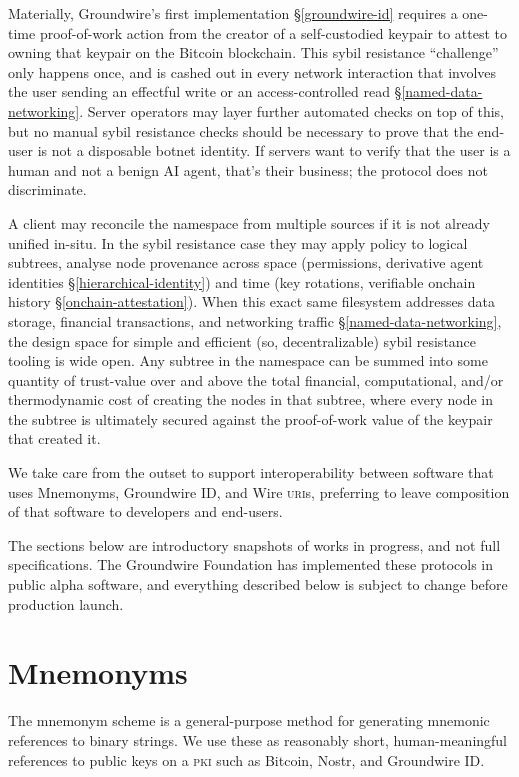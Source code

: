 \documentclass[twoside]{article}
\begin{document}
\sloppy
Materially, Groundwire's first implementation \S\ref{groundwire-id}
requires a one-time proof-of-work action from the creator of a
self-custodied keypair to attest to owning that keypair on the Bitcoin
blockchain. This sybil resistance ``challenge'' only happens once, and
is cashed out in every network interaction that involves the user
sending an effectful write or an access-controlled read
\S\ref{named-data-networking}. Server operators may layer further
automated checks on top of this, but no manual sybil resistance checks
should be necessary to prove that the end-user is not a disposable
botnet identity. If servers want to verify that the user is a human and
not a benign AI agent, that's their business; the protocol does not
discriminate.

\sloppy
A client may reconcile the namespace from multiple sources if it is not
already unified in-situ. In the sybil resistance case they may apply
policy to logical subtrees, analyse node provenance across space (permissions,
derivative agent identities \S\ref{hierarchical-identity}) and time
(key rotations, verifiable onchain history \S\ref{onchain-attestation}). When this exact same
filesystem addresses data storage, \mbox{financial} transactions, and
networking traffic \S\ref{named-data-networking}, the design space for
simple and efficient (so, decentralizable) sybil resistance tooling is wide open.
Any subtree in the namespace can be summed into some quantity of trust-value over and
above the total financial, computational, and/or thermodynamic cost of
creating the nodes in that subtree, where every node in the subtree is
ultimately secured against the proof-of-work value of the keypair that
created it.

We take care from the outset to support interoperability between
software that uses Mnemonyms, Groundwire ID, and Wire \textsc{uri}s,
preferring to leave composition of that software to developers and end-users.

The sections below are introductory snapshots of works in progress, and
not full specifications. The Groundwire Foundation has implemented these
protocols in public alpha software, and everything described below is
subject to change before production launch.

\section{Mnemonyms}\label{mnemonyms}

The mnemonym scheme is a general-purpose method for generating mnemonic
references to binary strings. We use these as reasonably short,
human-meaningful references to public keys on a \textsc{pki} such as Bitcoin,
Nostr, and Groundwire ID.
\end{document}
